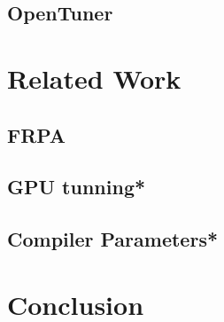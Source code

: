 \documentclass[a4paper, 12pt]{article}
\begin{document}
\subsection{OpenTuner}

\section{Related Work}

\subsection{FRPA}

\subsection{GPU tunning*}

\subsection{Compiler Parameters*}

\section{Conclusion}



\end{document}
